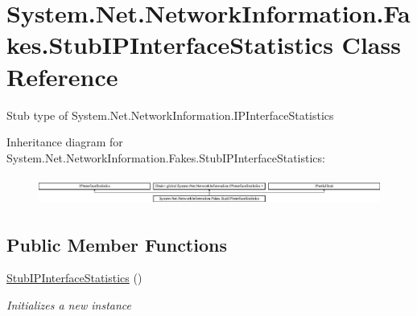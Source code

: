 \hypertarget{class_system_1_1_net_1_1_network_information_1_1_fakes_1_1_stub_i_p_interface_statistics}{\section{System.\-Net.\-Network\-Information.\-Fakes.\-Stub\-I\-P\-Interface\-Statistics Class Reference}
\label{class_system_1_1_net_1_1_network_information_1_1_fakes_1_1_stub_i_p_interface_statistics}
}


Stub type of System.\-Net.\-Network\-Information.\-I\-P\-Interface\-Statistics 


Inheritance diagram for System.\-Net.\-Network\-Information.\-Fakes.\-Stub\-I\-P\-Interface\-Statistics\-:\begin{figure}[H]
\begin{center}
\leavevmode
\includegraphics[height=0.935673cm]{class_system_1_1_net_1_1_network_information_1_1_fakes_1_1_stub_i_p_interface_statistics}
\end{center}
\end{figure}
\subsection*{Public Member Functions}
\begin{DoxyCompactItemize}
\item 
\hyperlink{class_system_1_1_net_1_1_network_information_1_1_fakes_1_1_stub_i_p_interface_statistics_a35c81385f54e50290c94ec2b23869cfe}{Stub\-I\-P\-Interface\-Statistics} ()
\begin{DoxyCompactList}\small\item\em Initializes a new instance\end{DoxyCompactList}\end{DoxyCompactItemize}
